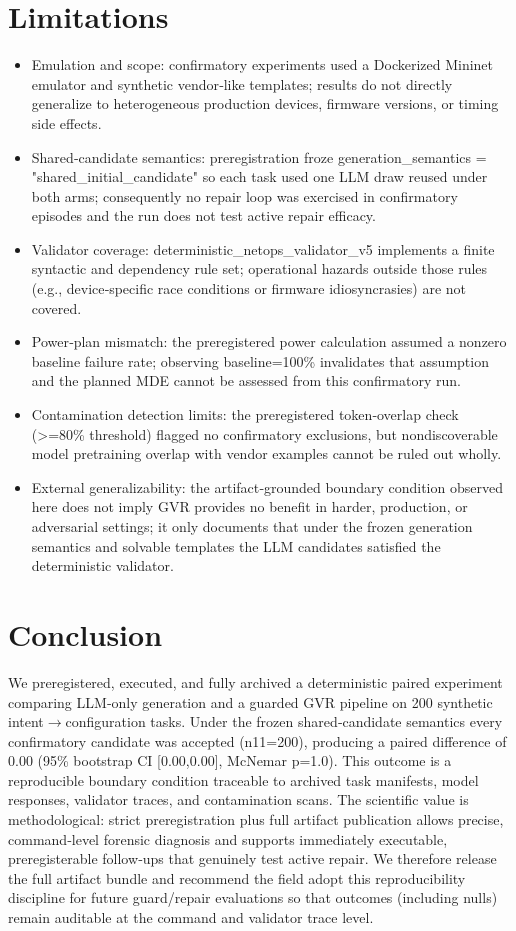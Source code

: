 \documentclass[conference]{IEEEtran}
\begin{document}
\section{Limitations}
\begin{itemize}
\item Emulation and scope: confirmatory experiments used a Dockerized Mininet emulator and synthetic vendor‑like templates; results do not directly generalize to heterogeneous production devices, firmware versions, or timing side effects.
\item Shared‑candidate semantics: preregistration froze generation\_semantics = "shared\_initial\_candidate" so each task used one LLM draw reused under both arms; consequently no repair loop was exercised in confirmatory episodes and the run does not test active repair efficacy.
\item Validator coverage: deterministic\_netops\_validator\_v5 implements a finite syntactic and dependency rule set; operational hazards outside those rules (e.g., device‑specific race conditions or firmware idiosyncrasies) are not covered.
\item Power‑plan mismatch: the preregistered power calculation assumed a nonzero baseline failure rate; observing baseline=100\% invalidates that assumption and the planned MDE cannot be assessed from this confirmatory run.
\item Contamination detection limits: the preregistered token‑overlap check (>=80\% threshold) flagged no confirmatory exclusions, but nondiscoverable model pretraining overlap with vendor examples cannot be ruled out wholly.
\item External generalizability: the artifact‑grounded boundary condition observed here does not imply GVR provides no benefit in harder, production, or adversarial settings; it only documents that under the frozen generation semantics and solvable templates the LLM candidates satisfied the deterministic validator.
\end{itemize}

\section{Conclusion}
We preregistered, executed, and fully archived a deterministic paired experiment comparing LLM‑only generation and a guarded GVR pipeline on 200 synthetic intent\ensuremath{\rightarrow}configuration tasks. Under the frozen shared‑candidate semantics every confirmatory candidate was accepted (n11=200), producing a paired difference of 0.00 (95\% bootstrap CI [0.00,0.00], McNemar p=1.0). This outcome is a reproducible boundary condition traceable to archived task manifests, model responses, validator traces, and contamination scans. The scientific value is methodological: strict preregistration plus full artifact publication allows precise, command‑level forensic diagnosis and supports immediately executable, preregisterable follow‑ups that genuinely test active repair. We therefore release the full artifact bundle and recommend the field adopt this reproducibility discipline for future guard/repair evaluations so that outcomes (including nulls) remain auditable at the command and validator trace level.
\end{document}
